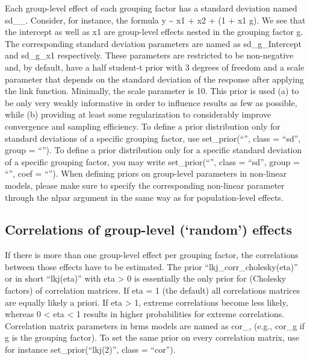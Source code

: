 \documentclass[]{book}
\begin{document}
Each group-level effect of each grouping factor has a standard deviation named sd\_\_. Consider, for instance, the formula y \textasciitilde{} x1 + x2 + (1 + x1 \textbar{} g). We see that the intercept as well as x1 are group-level effects nested in the grouping factor g. The corresponding standard deviation parameters are named as sd\_g\_Intercept and sd\_g\_x1 respectively. These parameters are restricted to be non-negative and, by default, have a half student-t prior with 3 degrees of freedom and a scale parameter that depends on the standard deviation of the response after applying the link function. Minimally, the scale parameter is 10. This prior is used (a) to be only very weakly informative in order to influence results as few as possible, while (b) providing at least some regularization to considerably improve convergence and sampling efficiency. To define a prior distribution only for standard deviations of a specific grouping factor, use set\_prior(``'', class = ``sd'', group = ``''). To define a prior distribution only for a specific standard deviation of a specific grouping factor, you may write set\_prior(``'', class = ``sd'', group = ``'', coef = ``'').
When defining priors on group-level parameters in non-linear models, please make sure to specify the corresponding non-linear parameter through the nlpar argument in the same way as for population-level effects.

\hypertarget{correlations-of-group-level-random-effects}{%
\subsection{Correlations of group-level (`random') effects}\label{correlations-of-group-level-random-effects}}

If there is more than one group-level effect per grouping factor, the correlations between those effects have to be estimated. The prior ``lkj\_corr\_cholesky(eta)'' or in short ``lkj(eta)'' with eta \textgreater{} 0 is essentially the only prior for (Cholesky factors) of correlation matrices. If eta = 1 (the default) all correlations matrices are equally likely a priori. If eta \textgreater{} 1, extreme correlations become less likely, whereas 0 \textless{} eta \textless{} 1 results in higher probabilities for extreme correlations. Correlation matrix parameters in brms models are named as cor\_, (e.g., cor\_g if g is the grouping factor). To set the same prior on every correlation matrix, use for instance set\_prior(``lkj(2)'', class = ``cor'').
\end{document}
